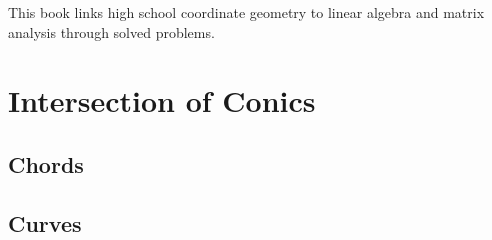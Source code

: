 \documentclass[11pt]{book}
\begin{document}

\setcounter{page}{1}

\begin{introduction}
This book links high school coordinate geometry to linear algebra and matrix analysis through solved problems.
\end{introduction}

\mainmatter
\chapter{Intersection of Conics}
\section{Chords}

\section{Curves}

\end{document}
